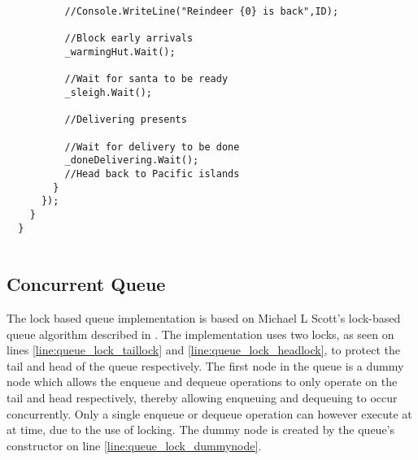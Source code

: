 \begin{lstlisting}
          //Console.WriteLine("Reindeer {0} is back",ID);

          //Block early arrivals
          _warmingHut.Wait();

          //Wait for santa to be ready
          _sleigh.Wait();

          //Delivering presents

          //Wait for delivery to be done
          _doneDelivering.Wait();
          //Head back to Pacific islands
        }
      });
    }
  }
  
\end{lstlisting}

\subsection{Concurrent Queue}
The lock based queue implementation is based on Michael L Scott's lock-based queue algorithm described in \cite{michael1996simple}. The implementation uses two locks, as seen on lines \ref{line:queue_lock_taillock} and \ref{line:queue_lock_headlock}, to protect the tail and head of the queue respectively. The first node in the queue is a dummy node which allows the enqueue and dequeue operations to only operate on the tail and head respectively, thereby allowing enqueuing and dequeuing to occur concurrently. Only a single enqueue or dequeue operation can however execute at at time, due to the use of locking. The dummy node is created by the queue's constructor on line \ref{line:queue_lock_dummynode}.


